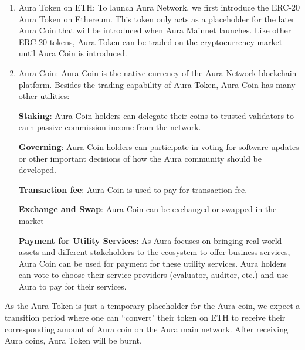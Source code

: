 \documentclass[12pt, titlepage]{article}
\begin{document}
\begin{enumerate}
    \item Aura Token on ETH: To launch Aura Network, we first introduce the ERC-20 Aura Token on Ethereum. This token only acts as a placeholder for the later Aura Coin that will be introduced when Aura Mainnet launches. Like other ERC-20 tokens, Aura Token can be traded on the cryptocurrency market until Aura Coin is introduced.
    \item Aura Coin: Aura Coin is the native currency of the Aura Network blockchain platform. Besides the trading capability of Aura Token, Aura Coin has many other utilities:

    \textbf{Staking}: Aura Coin holders can delegate their coins to trusted validators to earn passive commission income from the network.
    
    \textbf{Governing}: Aura Coin holders can participate in voting for software updates or other important decisions of how the Aura community should be developed.
    
    \textbf{Transaction fee}: Aura Coin is used to pay for transaction fee.
    
    \textbf{Exchange and Swap}: Aura Coin can be exchanged or swapped in the market
    
    \textbf{Payment for Utility Services}: As Aura focuses on bringing real-world assets and different stakeholders to the ecosystem to offer business services, Aura Coin can be used for payment for these utility services. Aura holders can vote to choose their service providers (evaluator, auditor, etc.) and use Aura to pay for their services.
\end{enumerate}

As the Aura Token is just a temporary placeholder for the Aura coin, we expect a transition period where one can ``convert" their token on ETH to receive their corresponding amount of Aura coin on the Aura main network. After receiving Aura coins, Aura Token will be burnt.
\end{document}
